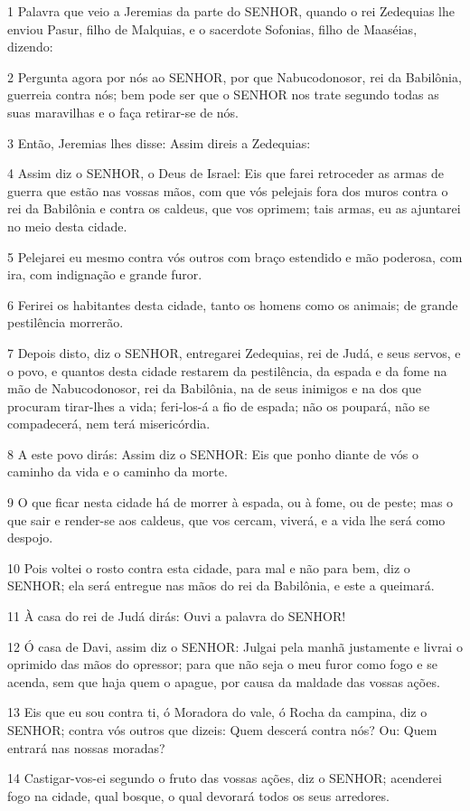 \par 1 Palavra que veio a Jeremias da parte do SENHOR, quando o rei Zedequias lhe enviou Pasur, filho de Malquias, e o sacerdote Sofonias, filho de Maaséias, dizendo:
\par 2 Pergunta agora por nós ao SENHOR, por que Nabucodonosor, rei da Babilônia, guerreia contra nós; bem pode ser que o SENHOR nos trate segundo todas as suas maravilhas e o faça retirar-se de nós.
\par 3 Então, Jeremias lhes disse: Assim direis a Zedequias:
\par 4 Assim diz o SENHOR, o Deus de Israel: Eis que farei retroceder as armas de guerra que estão nas vossas mãos, com que vós pelejais fora dos muros contra o rei da Babilônia e contra os caldeus, que vos oprimem; tais armas, eu as ajuntarei no meio desta cidade.
\par 5 Pelejarei eu mesmo contra vós outros com braço estendido e mão poderosa, com ira, com indignação e grande furor.
\par 6 Ferirei os habitantes desta cidade, tanto os homens como os animais; de grande pestilência morrerão.
\par 7 Depois disto, diz o SENHOR, entregarei Zedequias, rei de Judá, e seus servos, e o povo, e quantos desta cidade restarem da pestilência, da espada e da fome na mão de Nabucodonosor, rei da Babilônia, na de seus inimigos e na dos que procuram tirar-lhes a vida; feri-los-á a fio de espada; não os poupará, não se compadecerá, nem terá misericórdia.
\par 8 A este povo dirás: Assim diz o SENHOR: Eis que ponho diante de vós o caminho da vida e o caminho da morte.
\par 9 O que ficar nesta cidade há de morrer à espada, ou à fome, ou de peste; mas o que sair e render-se aos caldeus, que vos cercam, viverá, e a vida lhe será como despojo.
\par 10 Pois voltei o rosto contra esta cidade, para mal e não para bem, diz o SENHOR; ela será entregue nas mãos do rei da Babilônia, e este a queimará.
\par 11 À casa do rei de Judá dirás: Ouvi a palavra do SENHOR!
\par 12 Ó casa de Davi, assim diz o SENHOR: Julgai pela manhã justamente e livrai o oprimido das mãos do opressor; para que não seja o meu furor como fogo e se acenda, sem que haja quem o apague, por causa da maldade das vossas ações.
\par 13 Eis que eu sou contra ti, ó Moradora do vale, ó Rocha da campina, diz o SENHOR; contra vós outros que dizeis: Quem descerá contra nós? Ou: Quem entrará nas nossas moradas?
\par 14 Castigar-vos-ei segundo o fruto das vossas ações, diz o SENHOR; acenderei fogo na cidade, qual bosque, o qual devorará todos os seus arredores.


